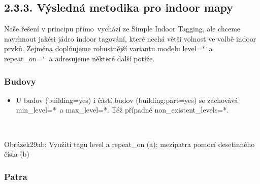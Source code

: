 \subsection{2.3.3. Výsledná metodika pro indoor mapy}\label{vuxfdslednuxe1-metodika-pro-indoor-mapy}

Naše řešení v principu přímo~vychází ze Simple Indoor Tagging, ale chceme navrhnout jakési jádro indoor tagování, které nechá větší volnost ve volbě indoor prvků. Zejména doplňujeme robustnější variantu modelu level=*~a repeat\_on=*~a adresujeme některé další potíže.

\subsubsection{Budovy}\label{budovy}

\begin{itemize}
\tightlist
\item
  U budov (building=yes) i částí budov (building:part=yes) se zachovává min\_level=*~a max\_level=*. Též případné non\_existent\_levels=*.
\end{itemize}

~ ~

Obrázek29ab: Využití tagu level a repeat\_on (a); mezipatra pomocí desetinného čísla (b)

\subsubsection{Patra}\label{patra}

